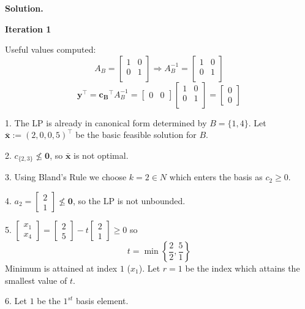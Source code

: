 \textbf{Solution.}

\textbf{Iteration 1}

Useful values computed:
\[ A_B=
\begin{bmatrix}
    1 & 0\\
    0 & 1\\
\end{bmatrix} \Rightarrow
A_B^{-1}=
\begin{bmatrix}
    1 & 0\\
    0 & 1\\
\end{bmatrix} \]
\[ \bm{y}^\top=\bm{c_B}^\top A_B^{-1}=
\begin{bmatrix}
    0 & 0
\end{bmatrix}
\begin{bmatrix}
    1 & 0\\
    0 & 1\\
\end{bmatrix}=
\begin{bmatrix}
    0 \\
    0
\end{bmatrix}\]

1. The LP is already in canonical form determined by $ B=\{1,4\} $.
Let $ \bm{\bar{x}}:=(2,0,0,5)^\top $ be the basic feasible solution for $ B $.

2. $ c_{\{2,3\}} \nleq \bm{0} $, so $ \bm{\bar{x}} $ is not optimal.

3. Using Bland's Rule we choose $ k=2\in N $ which enters the basis
as $ c_2\ge 0 $.

4.
$ 
a_2= \begin{bmatrix}
    2\\
    1
\end{bmatrix}\nleq \bm{0}
$, so the LP is not unbounded.

5.
$
\begin{bmatrix}
    x_1\\
    x_4
\end{bmatrix}
=
\begin{bmatrix}
    2\\
    5
\end{bmatrix}-t
\begin{bmatrix}
    2\\
    1
\end{bmatrix}\ge 0
$
so
\[ t=\min \left\{\frac{2}{2},\frac{5}{1} \right\} \]
Minimum is attained at index $ 1 $ ($ x_1 $). Let $ r=1 $ be the index which attains the smallest value of $ t $.

6. Let $ 1 $ be the $ 1^{st} $ basis element.

